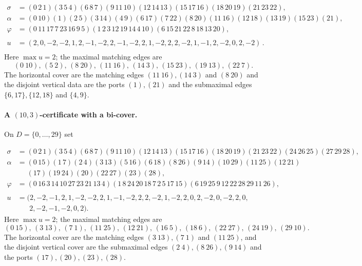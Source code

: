 \documentclass[11pt]{article}
\theoremstyle{remark}
\begin{document}
\begin{equation}
\begin{aligned}
\sigma&=(0\,2\,1)(3\,5\,4)(6\,8\,7)(9\,11\,10)(12\,14\,13)(15\,17\,16)(18\,20\,19)
(21\,23\,22),\\[2pt]
\alpha&=(0\,10)(1)(2\,5)(3\,14)(4\,9)(6\,17)(7\,22)(8\,20)(11\,16)(12\,18)(13\,19)(15\,23)(21),\\[2pt]
\varphi&=(0\,11\,17\,7\,23\,16\,9\,5)(1\,2\,3\,12\,19\,14\,4\,10)(6\,15\,21\,22\,8\,18\,13\,20) ,\\ \\[2pt]
u&=(2,0,-2,-2,1,2,-1,-2,2,-1,-2,2,1,-2,2,2,-2,1,-1,2,-2,0,2,-2) \, .\\
\end{aligned}
\label{eq:C83}
\end{equation}
Here $\max u=2$; the maximal matching edges are\[(0\ 10),\,(5\ 2),\,(8\ 20),\,(11\ 16),\,(14\ 3),\,(15\ 23),\,(19\ 13),\,(22\ 7).\]
The horizontal cover are the matching edges $(11\ 16), (14\ 3)$ and $(8\ 20)$ and the disjoint vertical data are the ports $(1), (21)$ and the submaximal edges $\{6,17\}, \{12,18\}$ and $\{4,9\}$.


\paragraph{A $(10,3)$-certificate with a bi-cover.} On $D=\{0,\dots,29\}$ set

\begin{equation}
\begin{aligned}
\sigma&=(0\,2\,1)(3\,5\,4)(6\,8\,7)(9\,11\,10)(12\,14\,13)(15\,17\,16)(18\,20\,19) (21\,23\,22)(24\,26\,25)(27\,29\,28),\\[2pt]
\alpha&=(0\,15)(1\,7)(2\,4)(3\,13)(5\,16)(6\,18)(8\,26)(9\,14)(10\,29)(11\,25)(12\,21)\\
&\quad \,\, (17)(19\,24)(20)(22\,27)(23)(28),\\[2pt]
\varphi&=(0\,16\,3\,14\,10\,27\,23\,21\,13\,4)(1\,8\,24\,20\,18\,7\,2\,5\,17\,15) (6\,19\,25\,9\,12\,22\,28\,29\,11\,26),\\ \\[2pt]
u&=(2,-2,-1,2,1,-2,-2,2,1,-1,-2,2,2,-2,1,-2,2,0,2,-2,0,-2,2,0,\\
&\quad \,\,\,\, 2,-2,-1,-2,0,2).
\end{aligned}
\label{eq:C103}
\end{equation}
Here $\max u=2$; the maximal matching edges are
\[(0\ 15),\,(3\ 13),\,(7\ 1),\,(11\ 25),\,(12\ 21),\,(16\ 5),\,(18\ 6),\,(22\ 27),\,(24\ 19),\,(29\ 10).\]
The horizontal cover are the matching edges $(3\ 13),(7\ 1)$ and $(11\ 25)$, and the disjoint vertical cover are the submaximal edges $(2\ 4),(8\ 26), (9\ 14)$ and the ports $(17), (20), (23), (28)$. 
\end{document}
